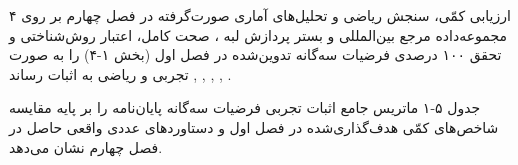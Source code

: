 


ارزیابی کمّی، سنجش ریاضی و تحلیل‌های آماری صورت‌گرفته در فصل چهارم بر روی ۴ مجموعه‌داده مرجع بین‌المللی  و بستر پردازش لبه ، صحت کامل، اعتبار روش‌شناختی و تحقق ۱۰۰ درصدی فرضیات سه‌گانه تدوین‌شده در فصل اول (بخش ۱{-}۴) را به صورت تجربی و ریاضی به اثبات رساند , , , , .\par



جدول ۵{-}۱ ماتریس جامع اثبات تجربی فرضیات سه‌گانه پایان‌نامه را بر پایه مقایسه شاخص‌های کمّی هدف‌گذاری‌شده در فصل اول و دستاوردهای عددی واقعی حاصل در فصل چهارم نشان می‌دهد.\par



